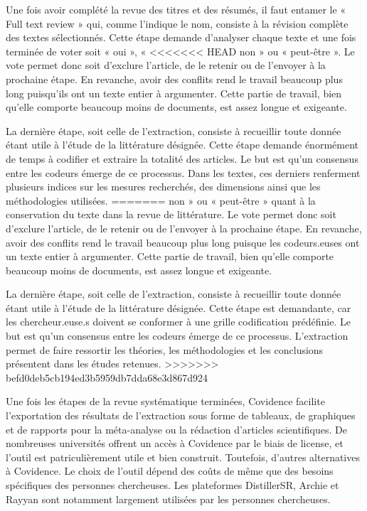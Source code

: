 \documentclass[
  letterpaper,
]{scrbook}
\begin{document}
Une fois avoir complété la revue des titres et des résumés, il faut
entamer le « Full text review » qui, comme l'indique le nom, consiste à
la révision complète des textes sélectionnés. Cette étape demande
d'analyser chaque texte et une fois terminée de voter soit « oui », «
<<<<<<< HEAD
non » ou « peut-être ». Le vote permet donc soit d'exclure l'article, de
le retenir ou de l'envoyer à la prochaine étape. En revanche, avoir des
conflits rend le travail beaucoup plus long puisqu'ils ont un texte
entier à argumenter. Cette partie de travail, bien qu'elle comporte
beaucoup moins de documents, est assez longue et exigeante.

La dernière étape, soit celle de l'extraction, consiste à recueillir
toute donnée étant utile à l'étude de la littérature désignée. Cette
étape demande énormément de temps à codifier et extraire la totalité des
articles. Le but est qu'un consensus entre les codeurs émerge de ce
processus. Dans les textes, ces derniers renferment plusieurs indices
sur les mesures recherchés, des dimensions ainsi que les méthodologies
utilisées.
=======
non » ou « peut-être » quant à la conservation du texte dans la revue de
littérature. Le vote permet donc soit d'exclure l'article, de le retenir
ou de l'envoyer à la prochaine étape. En revanche, avoir des conflits
rend le travail beaucoup plus long puisque les codeurs.euses ont un
texte entier à argumenter. Cette partie de travail, bien qu'elle
comporte beaucoup moins de documents, est assez longue et exigeante.

La dernière étape, soit celle de l'extraction, consiste à recueillir
toute donnée étant utile à l'étude de la littérature désignée. Cette
étape est demandante, car les chercheur.euse.s doivent se conformer à
une grille codification prédéfinie. Le but est qu'un consensus entre les
codeurs émerge de ce processus. L'extraction permet de faire ressortir
les théories, les méthodologies et les conclusions présentent dans les
études retenues.
>>>>>>> befd0deb5cb194ed3b5959db7dda68e3d867d924

Une fois les étapes de la revue systématique terminées, Covidence
facilite l'exportation des résultats de l'extraction sous forme de
tableaux, de graphiques et de rapports pour la méta-analyse ou la
rédaction d'articles scientifiques. De nombreuses universités offrent un
accès à Covidence par le biais de license, et l'outil est
patriculièrement utile et bien construit. Toutefois, d'autres
alternatives à Covidence. Le choix de l'outil dépend des coûts de même
que des besoins spécifiques des personnes chercheuses. Les plateformes
DistillerSR, Archie et Rayyan sont notamment largement utilisées par les
personnes chercheuses.
\end{document}
